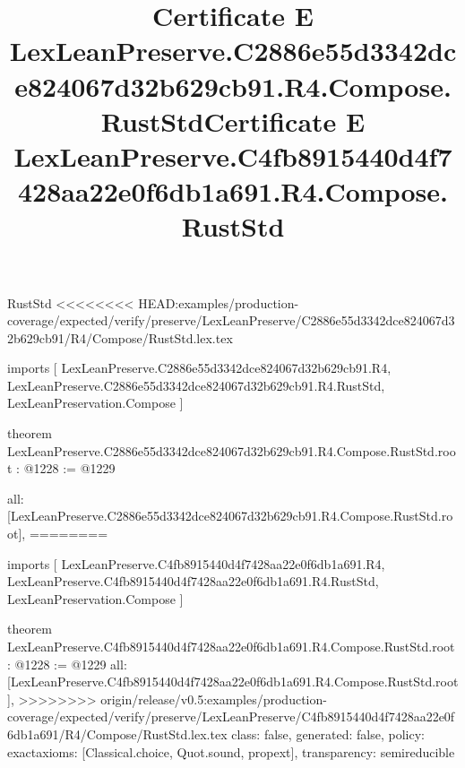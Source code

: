 \begin{lexlean}{RustStd}
<<<<<<<< HEAD:examples/production-coverage/expected/verify/preserve/LexLeanPreserve/C2886e55d3342dce824067d32b629cb91/R4/Compose/RustStd.lex.tex
\title{Certificate E LexLeanPreserve.C2886e55d3342dce824067d32b629cb91.R4.Compose.RustStd}
\begin{coremodule}
imports [
  LexLeanPreserve.C2886e55d3342dce824067d32b629cb91.R4,
  LexLeanPreserve.C2886e55d3342dce824067d32b629cb91.R4.RustStd,
  LexLeanPreservation.Compose
]

theorem LexLeanPreserve.C2886e55d3342dce824067d32b629cb91.R4.Compose.RustStd.root : @1228 := @1229 {
  all: [LexLeanPreserve.C2886e55d3342dce824067d32b629cb91.R4.Compose.RustStd.root],
========
\title{Certificate E LexLeanPreserve.C4fb8915440d4f7428aa22e0f6db1a691.R4.Compose.RustStd}
\begin{coremodule}
imports [
  LexLeanPreserve.C4fb8915440d4f7428aa22e0f6db1a691.R4,
  LexLeanPreserve.C4fb8915440d4f7428aa22e0f6db1a691.R4.RustStd,
  LexLeanPreservation.Compose
]

theorem LexLeanPreserve.C4fb8915440d4f7428aa22e0f6db1a691.R4.Compose.RustStd.root : @1228 := @1229 {
  all: [LexLeanPreserve.C4fb8915440d4f7428aa22e0f6db1a691.R4.Compose.RustStd.root],
>>>>>>>> origin/release/v0.5:examples/production-coverage/expected/verify/preserve/LexLeanPreserve/C4fb8915440d4f7428aa22e0f6db1a691/R4/Compose/RustStd.lex.tex
  class: false,
  generated: false,
  policy: exact{axioms: [Classical.choice, Quot.sound, propext]},
  transparency: semireducible
}


\end{coremodule}}
\end{coremodule}
\end{lexlean}

